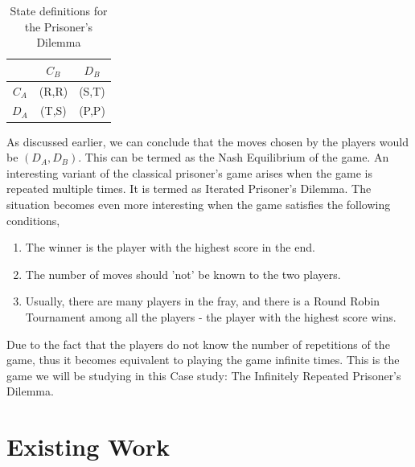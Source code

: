 \documentclass[a4paper]{article}
\begin{document}
	\begin{table}[H]
	\centering
	\begin{tabular}{|c|c|c|}
	\hline
					& $C_{B}$           		& $D_{B}$ 					\\ \hline
	$C_{A}$  		& (R,R) 		 			& (S,T)         			\\ \hline
	$D_{A}$ 		& (T,S)           			& (P,P)            			\\ \hline
	\end{tabular}
	\caption{State definitions for the Prisoner's Dilemma}
	\end{table}

	As discussed earlier, we can conclude that the moves chosen by the players would be $(D_{A},D_{B})$. This can be termed as the Nash Equilibrium of the game. An interesting variant of the classical prisoner's game arises when the game is repeated multiple times. It is termed as Iterated Prisoner's Dilemma. The situation becomes even more interesting when the game satisfies the following conditions,
	\begin{enumerate}
	\item The winner is the player with the highest score in the end.
	\item The number of moves should 'not' be known to the two players.
	\item Usually, there are many players in the fray, and there is a Round Robin Tournament among all the players - the player with the highest score wins.		
	\end{enumerate}
	
	Due to the fact that the players do not know the number of repetitions of the game, thus it becomes equivalent to playing the game infinite times.	This is the game we will be studying in this Case study: The Infinitely Repeated Prisoner's Dilemma.
	
	\section{Existing Work}
	
\end{document}
